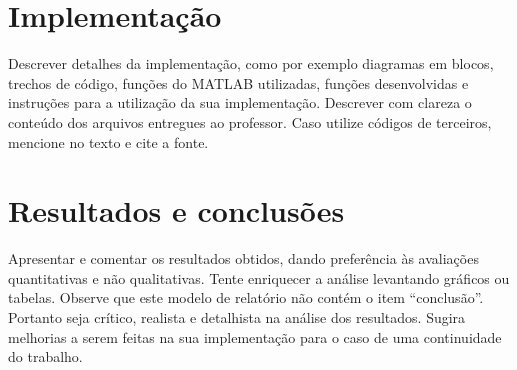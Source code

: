 \documentclass[11pt]{article}
\begin{document}
\section{Implementação}

	Descrever detalhes da implementação, como por exemplo diagramas em blocos, trechos de código, funções do MATLAB utilizadas, funções desenvolvidas e instruções para a utilização da sua implementação. Descrever com clareza o conteúdo dos arquivos entregues ao professor. Caso utilize códigos de terceiros, mencione no texto e cite a fonte.

\section{Resultados e conclusões}

	Apresentar e comentar os resultados obtidos, dando preferência às avaliações quantitativas e não qualitativas. Tente enriquecer a análise levantando gráficos ou tabelas. Observe que este modelo de relatório não contém o item ``conclusão''. Portanto seja crítico, realista e detalhista na análise dos resultados. Sugira melhorias a serem feitas na sua implementação para o caso de uma continuidade do trabalho.



\end{document}
